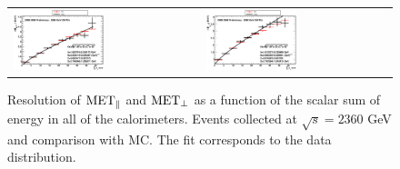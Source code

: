\begin{figure}[h!]
 \centering
 \begin{tabular}{ll}
   \includegraphics[width=0.5\textwidth]{plots_DataVsMC_MB_2360GeV/DATA_METpar_TT_sigma_2360.eps} &
    \includegraphics[width=0.5\textwidth]{plots_DataVsMC_MB_2360GeV/DATA_METperp_TT_sigma_2360.eps} \\
    \end{tabular}
 \caption{ Resolution of $\rm{MET}_{\parallel}$ and ${\rm
     MET}_{\perp}$  as a function of the scalar sum of energy in all
   of the calorimeters. Events collected at $\sqrt{s}=2360$ GeV and
   comparison with MC. The fit corresponds to the data distribution.
\label{fig:MET-res-2360}}
\end{figure}

\clearpage

